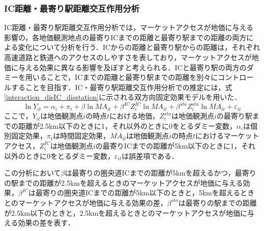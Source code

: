 \subsubsection{IC距離・最寄り駅距離交互作用分析}
IC距離・最寄り駅距離交互作用分析では，マーケットアクセスが地価に与える影響の，各地価観測地点の最寄りICまでの距離と最寄り駅までの距離の両方による変化について分析を行う．ICからの距離と最寄り駅からの距離は，それぞれ高速道路と鉄道へのアクセスのしやすさを表しており，マーケットアクセスが地価に与える効果に異なる影響を及ぼすと考えられる．ICと最寄り駅の両方のダミーを用いることで，ICまでの距離と最寄り駅までの距離を別々にコントロールすることを目指す．IC・最寄り駅距離交互作用分析での推定には，式\ref{interaction_disIC_disstation}に示される双方向固定効果モデルを用いた．
\begin{equation}
  \ln{Y_{it}} = \alpha_{i} + \pi_{t} + \beta\ln{MA_{it}} + \beta^{IC}Z^{IC}_{i}\ln{MA_{it}} + \beta^{sta}Z^{sta}_{i}\ln{MA_{it}} + \varepsilon_{it}
  \label{interaction_disIC_disstation}
\end{equation}
ここで，$Y_{it}$は地価観測点$i$の時点$t$における地価，$Z^{sta}_{i}$は地価観測点$i$の最寄り駅までの距離が2.5km以下のときに1，それ以外のときに0をとるダミー変数，$\alpha_{i}$は個別固定効果，$\pi_{t}$は時間固定効果，$MA_{it}$は地価観測点$i$の時点$t$におけるマーケットアクセス，$Z^{IC}_{i}$は地価観測点$i$の最寄りICまでの距離が5km以下のときに1，それ以外のときに0をとるダミー変数，$\varepsilon_{it}$は誤差項である．

この分析において$\beta$は最寄りの圏央道ICまでの距離が5kmを超えるかつ，最寄りの駅までの距離が2.5kmを超えるときのマーケットアクセスが地価に与える効果，$\beta^{IC}$は最寄りの圏央道ICまでの距離が5km以下のときと，5kmを超えるときとのマーケットアクセスが地価に与える効果の差，$\beta^{sta}$は最寄りの駅までの距離が2.5km以下のときと，2.5kmを超えるときとのマーケットアクセスが地価に与える効果の差を表す．

